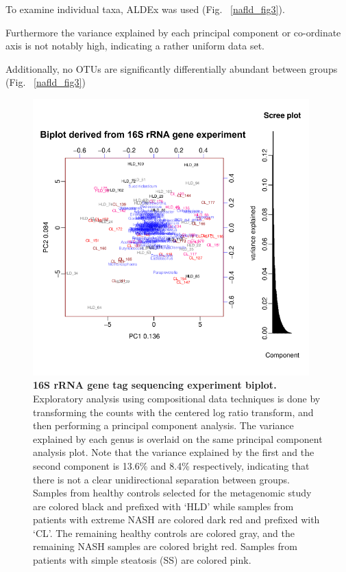 To examine individual taxa, ALDEx was used (Fig. ~\ref{nafld_fig3}).

Furthermore the variance explained by each principal component or co-ordinate axis is not notably high, indicating a rather uniform data set.


Additionally, no OTUs are significantly differentially abundant between groups (Fig. ~\ref{nafld_fig3})

\begin{figure}[h]
\begin{center}
\includegraphics[width=0.95\textwidth]{nafld_16s_biplot.png}
\caption[16S rRNA gene tag sequencing experiment biplot.]{\textbf{16S rRNA gene tag sequencing experiment biplot.} Exploratory analysis using compositional data techniques is done by transforming the counts with the centered log ratio transform, and then performing a principal component analysis. The variance explained by each genus is overlaid on the same principal component analysis plot. Note that the variance explained by the first and the second component is 13.6\% and 8.4\% respectively, indicating that there is not a clear unidirectional separation between groups. Samples from healthy controls selected for the metagenomic study are colored black and prefixed with `HLD' while samples from patients with extreme NASH are colored dark red and prefixed with `CL'. The remaining healthy controls are colored gray, and the remaining NASH samples are colored bright red. Samples from patients with simple steatosis (SS) are colored pink.}
\label{nafld_16s_biplot}
\end{center}
\end{figure}

